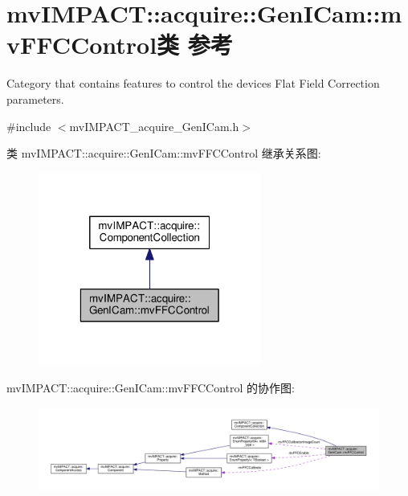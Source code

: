 \hypertarget{classmv_i_m_p_a_c_t_1_1acquire_1_1_gen_i_cam_1_1mv_f_f_c_control}{\section{mv\+I\+M\+P\+A\+C\+T\+:\+:acquire\+:\+:Gen\+I\+Cam\+:\+:mv\+F\+F\+C\+Control类 参考}
\label{classmv_i_m_p_a_c_t_1_1acquire_1_1_gen_i_cam_1_1mv_f_f_c_control}
}


Category that contains features to control the devices Flat Field Correction parameters.  




{\ttfamily \#include $<$mv\+I\+M\+P\+A\+C\+T\+\_\+acquire\+\_\+\+Gen\+I\+Cam.\+h$>$}



类 mv\+I\+M\+P\+A\+C\+T\+:\+:acquire\+:\+:Gen\+I\+Cam\+:\+:mv\+F\+F\+C\+Control 继承关系图\+:
\nopagebreak
\begin{figure}[H]
\begin{center}
\leavevmode
\includegraphics[width=208pt]{classmv_i_m_p_a_c_t_1_1acquire_1_1_gen_i_cam_1_1mv_f_f_c_control__inherit__graph}
\end{center}
\end{figure}


mv\+I\+M\+P\+A\+C\+T\+:\+:acquire\+:\+:Gen\+I\+Cam\+:\+:mv\+F\+F\+C\+Control 的协作图\+:
\nopagebreak
\begin{figure}[H]
\begin{center}
\leavevmode
\includegraphics[width=350pt]{classmv_i_m_p_a_c_t_1_1acquire_1_1_gen_i_cam_1_1mv_f_f_c_control__coll__graph}
\end{center}
\end{figure}
